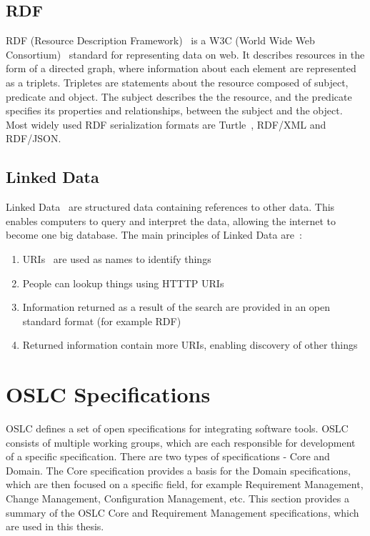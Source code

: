 \subsection*{RDF}
RDF (Resource Description Framework) \cite{rdf} is a W3C (World Wide Web Consortium) \cite{w3c} standard for representing data on web. It describes resources in the form of a directed graph, where information about each element are represented as a triplets. Tripletes are statements about the resource composed of subject, predicate and object. The subject describes the the resource, and the predicate specifies its properties and relationships, between the subject and the object. Most widely used RDF serialization formats are Turtle \cite{turtle}, RDF/XML and RDF/JSON.

\subsection*{Linked Data}
Linked Data \cite{linked_data} are structured data containing references to other data. This enables computers to query and interpret the data, allowing the internet to become one big database. The main principles of Linked Data are \cite{linked_data_design_issues}:
\begin{enumerate}
  \item URIs \cite{uri_rfc} are used as names to identify things
  \item People can lookup things using HTTTP URIs
  \item Information returned as a result of the search are provided in an open standard format (for example RDF)
  \item Returned information contain more URIs, enabling discovery of other things
\end{enumerate}

\section{OSLC Specifications}
OSLC defines a set of open specifications for integrating software tools. OSLC consists of multiple working groups, which are each responsible for development of a specific specification. There are two types of specifications - Core and Domain. The Core specification provides a basis for the Domain specifications, which are then focused on a specific field, for example Requirement Management, Change Management, Configuration Management, etc. This section provides a summary of the OSLC Core and Requirement Management specifications, which are used in this thesis.

